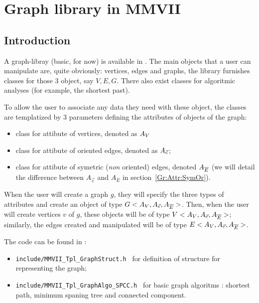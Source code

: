 


\chapter{Graph library in MMVII}



\section{Introduction}

A  graph-libray (basic, for now) is available in \PPP.  The main objects that a user can
manipulate are, quite obviously: vertices, edges and graphs, the library
furnishes classes for those $3$ object, say $V,E,G$.
There also exist classes for algoritmic analyses (for example, the  shortest past).

To allow the user to associate any data they need with these object, the classes
are templatized by $3$ parameters defining the attributes of objects of the graph:

\begin{itemize}
      \item  class for attibute of vertices, denoted as $A_V$
      \item  class for attibute of oriented edges, denoted as $A_{\vec{e}}$;
      \item  class for attibute of symetric (\emph{non} oriented) edges, denoted $A_{\overline{E}}$ (we will detail the difference
             between  $A_{\vec{e}}$ and  $A_{\overline{E}}$ in section~\ref{Gr:Attr:SymOr}).
\end{itemize}

When the user will create a graph $g$, they will specify the three types of attributes and create
an object of type $G<A_V,A_{\vec{e}},A_{\overline{E}}>$.  Then, when the user will create
vertices $v$ of $g$, these objects will be of type $V<A_V,A_{\vec{e}},A_{\overline{E}}>$;
similarly, the edges created and manipulated  will be of type $E<A_V,A_{\vec{e}},A_{\overline{E}}>$.

The code can be found in :

\begin{itemize}
    \item {\tt include/MMVII\_Tpl\_GraphStruct.h } for definition of structure for representing the graph;
    \item {\tt include/MMVII\_Tpl\_GraphAlgo\_SPCC.h } for basic graph algoritms : shortest path, minimum
          spaning tree and connected component.
\end{itemize}

